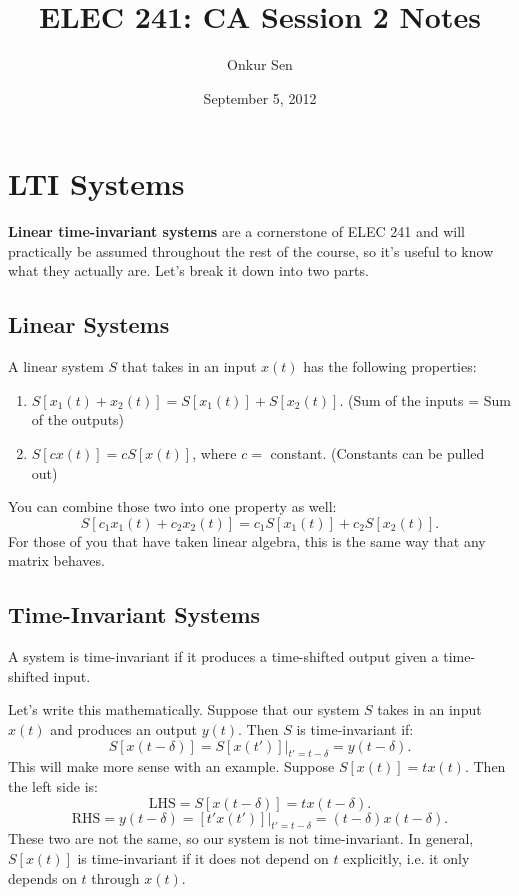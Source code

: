 \documentclass[11pt]{article}
\title{ELEC 241: CA Session 2 Notes}
\author{Onkur Sen}
\date{September 5, 2012}
\begin{document}
\maketitle

\section{LTI Systems}
{\bf Linear time-invariant systems} are a cornerstone of ELEC 241 and will practically be assumed throughout the rest of the course, so it's useful to know what they actually are. Let's break it down into two parts.

\subsection{Linear Systems}
A linear system $S$ that takes in an input $x(t)$ has the following properties:
\begin{enumerate}
\item $S[x_1(t)+x_2(t)] = S[x_1(t)] + S[x_2(t)]$. \hfill (Sum of the inputs = Sum of the outputs)
\item $S[cx(t)] = cS[x(t)]$, where $c = $ constant. \hfill (Constants can be pulled out)
\end{enumerate}
You can combine those two into one property as well:
\[ S[c_1x_1(t)+c_2x_2(t)] = c_1S[x_1(t)] + c_2S[x_2(t)]. \]
For those of you that have taken linear algebra, this is the same way that any matrix behaves.

\subsection{Time-Invariant Systems}
A system is time-invariant if it produces a time-shifted output given a time-shifted input.

Let's write this mathematically. Suppose that our system $S$ takes in an input $x(t)$ and produces an output $y(t)$. Then $S$ is time-invariant if:
\[S[x(t-\delta)] = S[x(t')]|_{t' = t - \delta} = y(t-\delta).\]
This will make more sense with an example. Suppose $S[x(t)] = tx(t)$. Then the left side is:
\[\mbox{LHS} = S[x(t-\delta)] = tx(t-\delta).\]
\[\mbox{RHS} = y(t-\delta) = [t'x(t')]\vert_{t' = t - \delta} = (t-\delta)x(t-\delta).\]
These two are not the same, so our system is not time-invariant. In general, $S[x(t)]$ is time-invariant if it does not depend on $t$ explicitly, i.e. it only depends on $t$ through $x(t)$.
\end{document}
